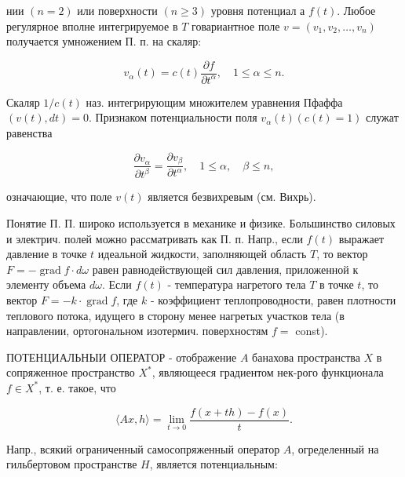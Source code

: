 \documentclass[10pt]{article}
\begin{document}
нии $(n=2)$ или поверхности $(n \geqslant 3)$ уровня потенциал а $f(t)$. Любое регулярное вполне интегрируемое в $T$ говариантное поле $v=\left(v_{1}, v_{2}, \ldots, v_{n}\right)$ получается умножением П. п. на скаляр:



\[

v_{\alpha}(t)=c(t) \frac{\partial f}{\partial t^{\alpha}}, \quad 1 \leqslant \alpha \leqslant n .

\]



Скаляр $1 / c(t)$ наз. интегрирующим множителем уравнения Пфаффа $(v(t), d t)=0$. Признаком потенциальности поля $v_{\alpha}(t)(c(t)=1)$ служат равенства



\[

\frac{\partial v_{\alpha}}{\partial t^{\beta}}=\frac{\partial v_{\beta}}{\partial t^{\alpha}}, \quad 1 \leqslant \alpha, \quad \beta \leqslant n,

\]



означающие, что поле $v(t)$ является безвихревым (см. Вихрь).



Понятие П. П. широко используется в механике и физике. Большинство силовых и электрич. полей можно рассматривать как П. п. Напр., если $f(t)$ выражает давление в точке $t$ идеальной жидкости, заполняющей область $T$, то вектор $F=-\operatorname{grad} f \cdot d \omega$ равен равнодействующей сил давления, приложенной к элементу объема $d \omega$. Если $f(t)$ - температура нагретого тела $T$ в точке $t$, то вектор $F=-k \cdot \operatorname{grad} f$, где $k$ - коэффициент теплопроводности, равен плотности теплового потока, идущего в сторону менее нагретых участков тела (в направлении, ортогональном изотермич. поверхностям $f=$ const).



ПОТЕНЦИАЛЬНЫИ ОПЕРАТОР - отображение $A$ банахова пространства $X$ в сопряженное пространство $X^{*}$, являющееся градиентом нек-рого функционала $f \in X^{*}$, т. е. такое, что



\[

\langle A x, h\rangle=\lim _{t \rightarrow 0} \frac{f(x+t h)-f(x)}{t} .

\]



Напр., всякий ограниченный самосопряженный оператор $A$, огределенный на гильбертовом пространстве $H$, является потенциальным:
\end{document}
